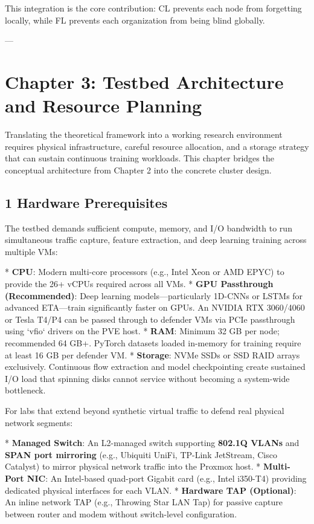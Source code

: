 \documentclass[conference]{IEEEtran}
\begin{document}
This integration is the core contribution: CL prevents each node from forgetting locally, while FL prevents each organization from being blind globally.

---


\section{Chapter 3: Testbed Architecture and Resource Planning}

Translating the theoretical framework into a working research environment requires physical infrastructure, careful resource allocation, and a storage strategy that can sustain continuous training workloads. This chapter bridges the conceptual architecture from Chapter 2 into the concrete cluster design.


\subsection{1 Hardware Prerequisites}

The testbed demands sufficient compute, memory, and I/O bandwidth to run simultaneous traffic capture, feature extraction, and deep learning training across multiple VMs:

* \textbf{CPU}: Modern multi-core processors (e.g., Intel Xeon or AMD EPYC) to provide the 26+ vCPUs required across all VMs.
* \textbf{GPU Passthrough (Recommended)}: Deep learning models—particularly 1D-CNNs or LSTMs for advanced ETA—train significantly faster on GPUs. An NVIDIA RTX 3060/4060 or Tesla T4/P4 can be passed through to defender VMs via PCIe passthrough using `vfio` drivers on the PVE host.
* \textbf{RAM}: Minimum 32 GB per node; recommended 64 GB+. PyTorch datasets loaded in-memory for training require at least 16 GB per defender VM.
* \textbf{Storage}: NVMe SSDs or SSD RAID arrays exclusively. Continuous flow extraction and model checkpointing create sustained I/O load that spinning disks cannot service without becoming a system-wide bottleneck.

For labs that extend beyond synthetic virtual traffic to defend real physical network segments:

* \textbf{Managed Switch}: An L2-managed switch supporting \textbf{802.1Q VLANs} and \textbf{SPAN port mirroring} (e.g., Ubiquiti UniFi, TP-Link JetStream, Cisco Catalyst) to mirror physical network traffic into the Proxmox host.
* \textbf{Multi-Port NIC}: An Intel-based quad-port Gigabit card (e.g., Intel i350-T4) providing dedicated physical interfaces for each VLAN.
* \textbf{Hardware TAP (Optional)}: An inline network TAP (e.g., Throwing Star LAN Tap) for passive capture between router and modem without switch-level configuration.
\end{document}
